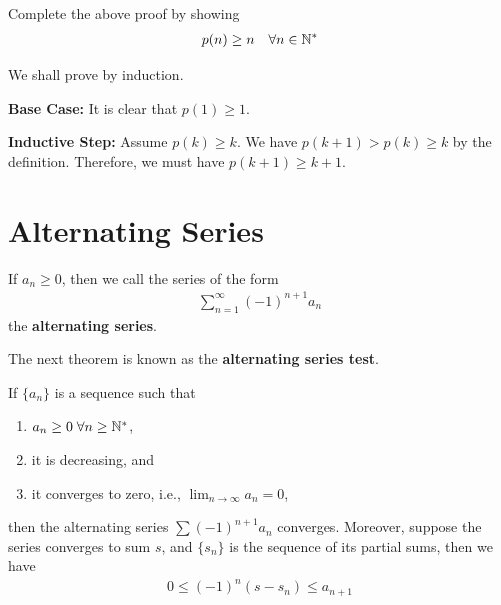 \documentclass[thmcnt=section, 12pt]{my-elegantbook}
\begin{document}
\begin{exercise}
    Complete the above proof by showing
    \begin{align*}
        p(n) \geq n
        \quad \forall n \in \mathbb{N}^\ast
    \end{align*}
    \label{ex:8}
\end{exercise}

\begin{solution}
    We shall prove by induction.

    \textbf{Base Case:} It is clear that $p(1) \geq 1$.

    \textbf{Inductive Step:} Assume  $p(k) \geq k$.
    We have  $p(k+1) > p(k) \geq k$ by the definition.
    Therefore, we must have  $p(k+1) \geq k+1$.
\end{solution}


\section{Alternating Series}


\begin{definition} \label{def:5}
    If $a_n \geq 0$, then we call the series of the form
    \begin{align*}
        \sum_{n=1}^\infty (-1)^{n+1} a_n
    \end{align*}
    the \textbf{alternating series}.
\end{definition}


The next theorem is known as the
\textbf{alternating series test}.

\begin{theorem} \label{thm:70}
    If $\{a_n\}$ is a sequence such that
    \begin{enumerate}
        \item $a_n \geq 0 \; \forall n \geq \mathbb{N}^\ast$,
        \item it is decreasing, and
        \item it converges to zero, i.e.,
              $\lim_{n \to \infty} a_n = 0$,
    \end{enumerate}
    then the alternating series $\sum (-1)^{n+1} a_n$
    converges.
    Moreover, suppose the series converges to sum $s$,
    and $\{s_n\}$ is the sequence of its partial sums,
    then we have
    \begin{align}
        0 \leq (-1)^n (s - s_n) \leq a_{n+1}
        \label{eq:133}
    \end{align}
\end{theorem}
\end{document}
